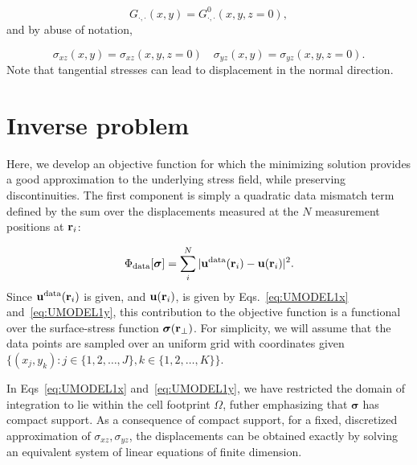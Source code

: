 \documentclass[aps,prl,reprint,twocolumn,groupedaddress,showpacs]{revtex4-1}
\def\r{{\bf r}}
\def\u{{\bf u}}
\newcommand{\bs}{\boldsymbol{\sigma}}
\begin{document}
\begin{equation}
G_{\cdot,\cdot}(x,y) = G^0_{\cdot,\cdot}(x,y,z=0),
\end{equation}
%
and by abuse of notation,

\begin{equation}
\sigma_{xz}(x,y) = \sigma_{xz}(x,y,z=0) \quad \sigma_{yz}(x,y) =
\sigma_{yz}(x,y,z=0).
\end{equation}
Note that tangential stresses can lead to displacement in the normal direction.

%

\section{Inverse problem}

Here, we develop an objective function for which the minimizing
solution provides a good approximation to the underlying stress field,
while preserving discontinuities.  The first component is simply a
quadratic data mismatch term defined by the sum over the displacements
measured at the $N$ measurement positions at $\r_{i}$:

\begin{equation}
\Phi_{\rm data}[\bs] = \sum_{i}^{N}\vert \u^{\rm
  data}(\r_{i})- \u(\r_i)\vert^{2}.
\end{equation}
%
Since $\u^{\rm data}(\r_{i})$ is given, and $\u(\r_{i})$, is given by
Eqs.~\ref{eq:UMODEL1x} and~\ref{eq:UMODEL1y}, this contribution to the
objective function is a functional over the surface-stress function
$\bs(\r_{\perp})$.  For simplicity, we will assume that the data
points are sampled over an uniform grid with coordinates given $\{
(x_j,y_k) : j\in\{1,2,\ldots,J\}, k\in\{1,2,\ldots,K\}\}.$

In Eqs~\ref{eq:UMODEL1x} and~\ref{eq:UMODEL1y}, we have restricted the
domain of integration to lie within the cell footprint $\Omega$,
futher emphasizing that $\boldsymbol\sigma$ has compact support. As a
consequence of compact support, for a fixed, discretized approximation
of $\sigma_{xz},\sigma_{yz}$, the displacements can be obtained
exactly by solving an equivalent system of linear equations of finite
dimension.
\end{document}
